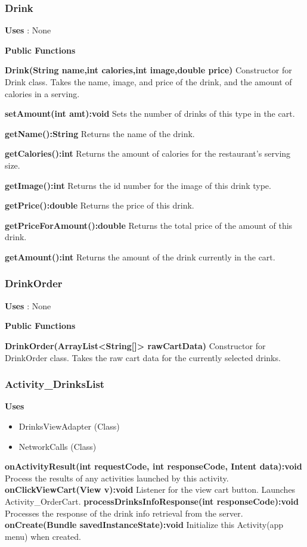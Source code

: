 \documentclass [10pt]{article}
\begin{document}
\subsubsection{Drink}

\textbf{Uses} : None

\textbf{Public Functions}

\textbf{Drink(String name,int calories,int image,double price)}
Constructor for Drink class. Takes the name, image, and price of the drink, and the amount of calories in a serving.

\textbf{setAmount(int amt):void}
Sets the number of drinks of this type in the cart.

\textbf{getName():String}
Returns the name of the drink.

\textbf{getCalories():int}
Returns the amount of calories for the restaurant’s serving size.

\textbf{getImage():int}
Returns the id number for the image of this drink type.

\textbf{getPrice():double}
Returns the price of this drink.

\textbf{getPriceForAmount():double}
Returns the total price of the amount of this drink.

\textbf{getAmount():int}
Returns the amount of the drink currently in the cart.

\subsubsection{DrinkOrder}

\textbf{Uses} : None

\textbf{Public Functions}

\textbf{DrinkOrder(ArrayList<String[]> rawCartData)}
Constructor for DrinkOrder class. Takes the raw cart data for the currently selected drinks.

\subsubsection{Activity\_DrinksList}

\textbf{Uses}

\begin{itemize}
	\item DrinksViewAdapter (Class)
	\item NetworkCalls (Class)
\end{itemize}

\textbf{onActivityResult(int requestCode, int responseCode, Intent data):void}
Process the results of any activities launched by this activity.
\textbf{onClickViewCart(View v):void}
Listener for the view cart button. Launches Activity\_OrderCart.
\textbf{processDrinksInfoResponse(int responseCode):void}
Processes the response of the drink info retrieval from the server.
\textbf{onCreate(Bundle savedInstanceState):void}
Initialize this Activity(app menu) when created.
\end{document}
